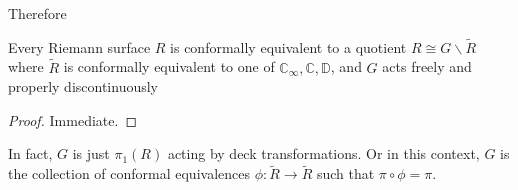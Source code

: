 Therefore
\begin{corollary}
    Every Riemann surface $R$ is conformally equivalent to a quotient $R\cong G\backslash\tilde{R}$ where $\tilde{R}$ is conformally equivalent to one of $\mathbb C_\infty,\mathbb C,\mathbb D$, and $G$ acts freely and properly discontinuously
\end{corollary}
\begin{proof}
    Immediate.
\end{proof}
\begin{remark}
    In fact, $G$ is just $\pi_1(R)$ acting by deck transformations.
    Or in this context, $G$ is the collection of conformal equivalences $\phi:\tilde{R}\to\tilde{R}$ such that $\pi\circ\phi=\pi$.
\end{remark}